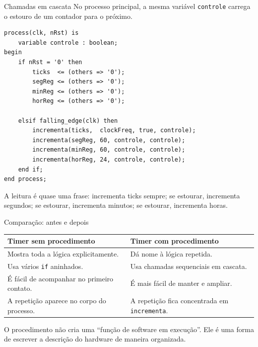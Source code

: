 \documentclass[aspectratio=169,11pt]{beamer}
\begin{document}
\begin{frame}[fragile]{Chamadas em cascata}
    No processo principal, a mesma variável \texttt{controle} carrega o estouro de um contador para o próximo.

\begin{lstlisting}
process(clk, nRst) is
    variable controle : boolean;
begin
    if nRst = '0' then
        ticks  <= (others => '0');
        segReg <= (others => '0');
        minReg <= (others => '0');
        horReg <= (others => '0');

    elsif falling_edge(clk) then
        incrementa(ticks,  clockFreq, true, controle);
        incrementa(segReg, 60, controle, controle);
        incrementa(minReg, 60, controle, controle);
        incrementa(horReg, 24, controle, controle);
    end if;
end process;
\end{lstlisting}

    \vspace{0.3em}
    A leitura é quase uma frase: incrementa ticks sempre; se estourar, incrementa segundos; se estourar, incrementa minutos; se estourar, incrementa horas.
\end{frame}

\begin{frame}{Comparação: antes e depois}
    \begin{table}
        \centering
        \small
        \begin{tabular}{p{} p{}}
            \toprule
            \textbf{Timer sem procedimento} & \textbf{Timer com procedimento} \\
            \midrule
            Mostra toda a lógica explicitamente. & Dá nome à lógica repetida. \\
            Usa vários \texttt{if} aninhados. & Usa chamadas sequenciais em cascata. \\
            É fácil de acompanhar no primeiro contato. & É mais fácil de manter e ampliar. \\
            A repetição aparece no corpo do processo. & A repetição fica concentrada em \texttt{incrementa}. \\
            \bottomrule
        \end{tabular}
    \end{table}

    \vspace{0.5em}
    O procedimento não cria uma ``função de software em execução''. Ele é uma forma de escrever a descrição do hardware de maneira organizada.
\end{frame}
\end{document}
